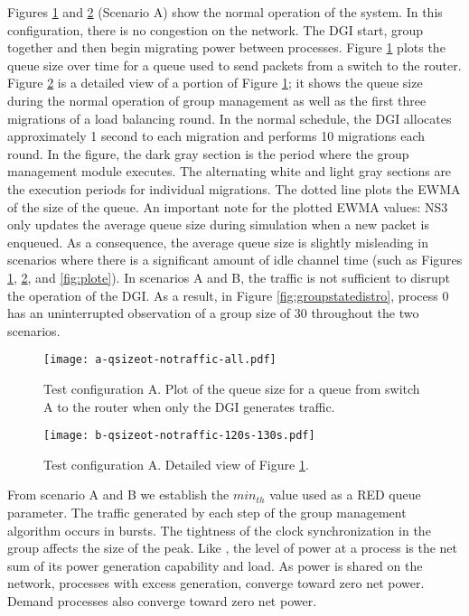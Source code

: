 Figures \ref{fig:plota} and \ref{fig:plotb} (Scenario A) show the normal operation of the system.
In this configuration, there is no congestion on the network. 
The \ac{DGI} start, group together and then begin migrating power between processes.
Figure \ref{fig:plota} plots the queue size over time for a queue used to send packets from a switch to the router.
Figure \ref{fig:plotb} is a detailed view of a portion of Figure \ref{fig:plota};
it shows the queue size during the normal operation of group management as well as the first three migrations of a load balancing round.
In the normal schedule, the DGI allocates approximately 1 second to each migration and performs 10 migrations each round.
In the figure, the dark gray section is the period where the group management module executes.
The alternating white and light gray sections are the execution periods for individual migrations.
The dotted line plots the \ac{EWMA} of the size of the queue.
An important note for the plotted \ac{EWMA} values: \ac{NS3} only updates the average queue size during simulation when a new packet is enqueued.
As a consequence, the average queue size is slightly misleading in scenarios where there is a significant amount of idle channel time (such as Figures \ref{fig:plota}, \ref{fig:plotb}, and \ref{fig:plote}).
In scenarios A and B, the traffic is not sufficient to disrupt the operation of the DGI.
As a result, in Figure \ref{fig:groupstatedistro}, process 0 has an uninterrupted observation of a group size of 30 throughout the two scenarios.

\begin{figure}[h!]
\centering
\texttt{[image: a-qsizeot-notraffic-all.pdf]}
\caption{Test configuration A. Plot of the queue size for a queue from switch A to the router when only the DGI generates traffic.}
\label{fig:plota}
\end{figure}
\begin{figure}[h!]
\centering
\texttt{[image: b-qsizeot-notraffic-120s-130s.pdf]}
\caption{Test configuration A. Detailed view of Figure \ref{fig:plota}.}
\label{fig:plotb}
\end{figure}



From scenario A and B we establish the $min_{th}$ value used as a \ac{RED} queue parameter.
The traffic generated by each step of the group management algorithm occurs in bursts.
The tightness of the clock synchronization in the group affects the size of the peak.
Like \cite{HILTESTBED}, the level of power at a process is the net sum of its power generation capability and load.
As power is shared on the network, processes with excess generation, converge toward zero net power.
Demand processes also converge toward zero net power.

